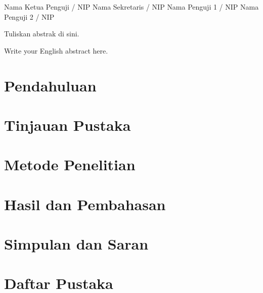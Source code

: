 \documentclass[skripsi]{unnes-ta_plus}
\begin{document}
\unnesFrontMatter

\maketitleunnes
\unnesPersetujuanPembimbing

\unnesPengesahanPenguji
  {Nama Ketua Penguji / NIP}
  {Nama Sekretaris / NIP}
  {Nama Penguji 1 / NIP}
  {Nama Penguji 2 / NIP}

\unnesPernyataanKeaslian

\begin{unnesabstract}
Tuliskan abstrak di sini.
\end{unnesabstract}

\begin{unnesabstracten}
Write your English abstract here.
\end{unnesabstracten}

\tableofcontents
\clearpage

\unnesMainMatter

\chapter{Pendahuluan}
\chapter{Tinjauan Pustaka}
\chapter{Metode Penelitian}
\chapter{Hasil dan Pembahasan}
\chapter{Simpulan dan Saran}

\chapter*{Daftar Pustaka}
\end{document}
